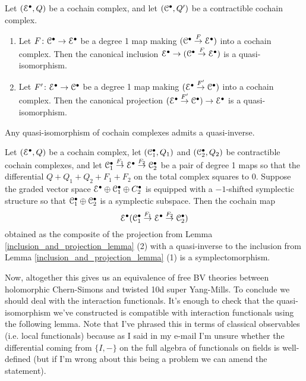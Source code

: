 \documentclass[10pt, oneside]{article}
\begin{document}
\begin{lemma} \label{inclusion_and_projection_lemma}
Let $(\mathcal{E}^\bullet, Q)$ be a cochain complex, and let $(\mathcal{C}^\bullet, Q')$ be a contractible cochain complex.
\begin{enumerate}
 \item Let $F \colon \mathcal{C}^\bullet \to \mathcal{E}^\bullet$ be a degree 1 map making $(\mathcal{C}^\bullet \overset F\to \mathcal{E}^\bullet)$ into a cochain complex.  Then the canonical inclusion $\mathcal{E}^\bullet \to (\mathcal{C}^\bullet \overset F\to \mathcal{E}^\bullet)$ is a quasi-isomorphism.
 \item Let $F' \colon \mathcal{E}^\bullet \to \mathcal{C}^\bullet$ be a degree 1 map making $(\mathcal{E}^\bullet \overset {F'}\to \mathcal{C}^\bullet)$ into a cochain complex.  Then the canonical projection $(\mathcal{E}^\bullet \overset {F'}\to \mathcal{C}^\bullet) \to \mathcal{E}^\bullet$ is a quasi-isomorphism.
\end{enumerate}
\end{lemma}

\begin{lemma}
Any quasi-isomorphism of cochain complexes admits a quasi-inverse.
\end{lemma}

\begin{lemma} \label{symplectic_composite_lemma}
Let $(\mathcal{E}^\bullet,Q)$ be a cochain complex, let $(\mathcal{C}_1^\bullet, Q_1)$ and $(\mathcal{C}_2^\bullet, Q_2)$ be contractible cochain complexes, and let $\mathcal{C}_1^\bullet \overset{F_1}\to \mathcal{E}^\bullet \overset{F_2}\to \mathcal{C}_2^\bullet$ be a pair of degree 1 maps so that the differential $Q + Q_1 + Q_2 + F_1 + F_2$ on the total complex squares to 0.  Suppose the graded vector space $\mathcal{E}^\bullet \oplus \mathcal{C}_1^\bullet \oplus C_2^\bullet$ is equipped with a $-1$-shifted symplectic structure so that $\mathcal{C}_1^\bullet \oplus \mathcal{C}_2^\bullet$ is a symplectic subspace.  Then the cochain map 
\begin{equation}
\label{symp_composite_eqn}\mathcal{E}^\bullet (\mathcal{C}_1^\bullet \overset{F_1}\to \mathcal{E}^\bullet \overset{F_2}\to \mathcal{C}_2^\bullet)
\end{equation}
obtained as the composite of the projection from Lemma \ref{inclusion_and_projection_lemma} (2) with a quasi-inverse to the inclusion from Lemma \ref{inclusion_and_projection_lemma} (1) is a symplectomorphism.
\end{lemma}

Now, altogether this gives us an equivalence of free BV theories between holomorphic Chern-Simons and twisted 10d super Yang-Mills.  To conclude we should deal with the interaction functionals.  It's enough to check that the quasi-isomorphism we've constructed is compatible with interaction functionals using the following lemma.  Note that I've phrased this in terms of classical observables (i.e. local functionals) because as I said in my e-mail I'm unsure whether the differential coming from $\{I,-\}$ on the full algebra of functionals on fields is well-defined (but if I'm wrong about this being a problem we can amend the statement).
\end{document}
